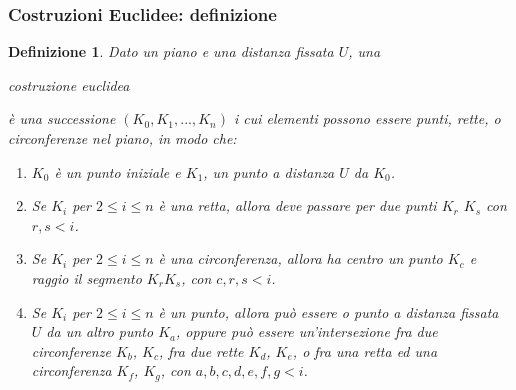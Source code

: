 \documentclass[11pt]{beamer}
\newtheorem{definizione}{Definizione}
\begin{document}
\begin{frame}
\frametitle{Costruzioni Euclidee: definizione}
\begin{definizione} 
Dato un piano e una distanza fissata $U$, una \begin{bfseries}costruzione euclidea\end{bfseries} è una successione $(K_{0}, K_{1},..., K_{n})$ i cui elementi possono essere punti, rette, o circonferenze nel piano, in modo che:

\begin{enumerate}

\item $K_{0}$ è un punto iniziale e $K_{1}$, un punto a distanza $U$ da $K_{0}$.

\item Se $K_{i}$ per $ 2\le i \le n$ è una retta, allora deve passare per due punti $K_{r}$ $K_{s}$ con $r, s < i$.

\item Se $K_{i}$ per $ 2 \le i \le n$ è una circonferenza, allora ha centro un punto $K_{c}$ e raggio il segmento $K_{r}K_{s}$, con $c, r, s < i$.

\item Se $K_{i}$ per $ 2\le i \le n$ è un punto, allora può essere o punto a distanza fissata $U$ da un altro punto $K_{a}$, oppure può essere un'intersezione fra due circonferenze $K_{b}$, $K_{c}$, fra due rette $K_{d}$, $K_{e}$, o fra una retta ed una circonferenza $K_{f}$, $K_{g}$, con $a,b,c,d,e,f,g < i$. 
\end{enumerate}
\end{definizione}
\end{frame}
\end{document}
